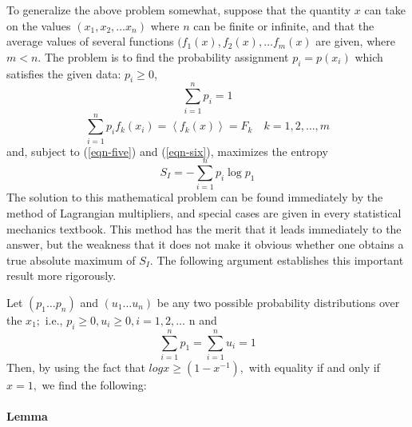 \documentclass[]{article}
\begin{document}
To generalize the above problem somewhat, suppose that the quantity
\(x\) can take on the values \((x_1, x_2, \dots x_n)\) where $n$ can be finite or
infinite, and that the average values of several functions $(f_1(x), f_2(x), \dots f_m(x)$ are given, where $m < n$. The problem is to find the probability assignment $p_i =
p(x_i)$ which satisfies the given data: $p_i \geq 0$,
%
\begin{equation}
\sum_{i = 1}^{n} p_{i} = 1 \label{eqn-five}
\end{equation}
\begin{equation}
\sum_{i = 1}^{n}  p_{i}f_{k}\left( x_{i} \right) = \left\langle f_{k}(x) \right\rangle = F_{k} \quad k = 1,2,\ldots,m \label{eqn-six}
\end{equation}
%
and, subject to (\ref{eqn-five}) and (\ref{eqn-six}), maximizes the entropy
%
\begin{equation}
S_{I} = - \sum_{i = 1}^{n} p_{i}\log p_{1} \label{eqn-seven}
\end{equation}
%
The solution to this mathematical problem can be found immediately by
the method of Lagrangian multipliers, and special cases are given in
every statistical mechanics textbook. This method has the merit that it
leads immediately to the answer, but the weakness that it does not make
it obvious whether one obtains a true absolute maximum of \(S_{I}\). The
following argument establishes this important result more rigorously.

Let \(\left( p_{1}\ldots p_{n} \right)\) and
\(\left( u_{1}\ldots u_{n} \right)\) be any two possible probability
distributions over the \(x_{1};\) i.e.,
\(p_{i} \geq 0,u_{i} \geq 0,i = 1,2,\ldots\) n and
%
\begin{equation}
\sum_{i = 1}^{n} p_{1} = \sum_{i = 1}^{n} u_{i} = 1
\end{equation}
%
Then, by using the fact that
\(logx \geq \left( 1 - x^{- 1} \right),\) with equality if and only if
\(x = 1,\) we find the following:

\paragraph{Lemma}
\end{document}

